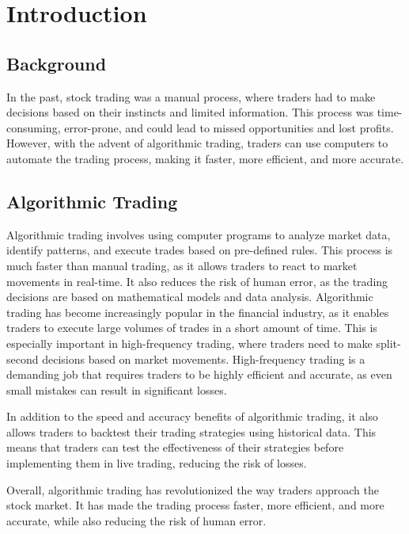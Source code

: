 
\chapter{Introduction} 

\label{Chapter1}

\section{Background}
In the past, stock trading was a manual process, where traders had to make decisions based on their instincts and limited information. This process was time-consuming, error-prone, and could lead to missed opportunities and lost profits. However, with the advent of algorithmic trading, traders can use computers to automate the trading process, making it faster, more efficient, and more accurate.

\section{Algorithmic Trading}
Algorithmic trading involves using computer programs to analyze market data, identify patterns, and execute trades based on pre-defined rules. This process is much faster than manual trading, as it allows traders to react to market movements in real-time. It also reduces the risk of human error, as the trading decisions are based on mathematical models and data analysis.
Algorithmic trading has become increasingly popular in the financial industry, as it enables traders to execute large volumes of trades in a short amount of time. This is especially important in high-frequency trading, where traders need to make split-second decisions based on market movements. High-frequency trading is a demanding job that requires traders to be highly efficient and accurate, as even small mistakes can result in significant losses.

In addition to the speed and accuracy benefits of algorithmic trading, it also allows traders to backtest their trading strategies using historical data. This means that traders can test the effectiveness of their strategies before implementing them in live trading, reducing the risk of losses.

Overall, algorithmic trading has revolutionized the way traders approach the stock market. It has made the trading process faster, more efficient, and more accurate, while also reducing the risk of human error.


